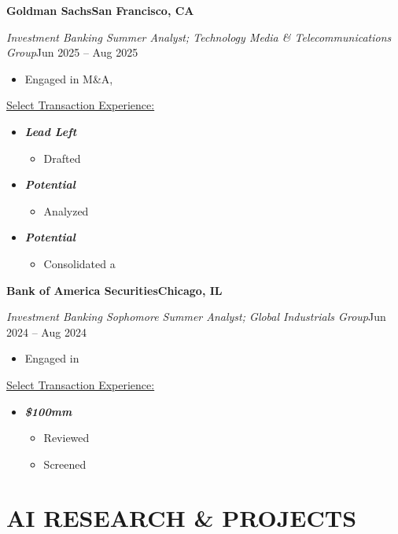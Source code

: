 \documentclass[10pt,letterpaper]{article}
\newcommand{\ressection}[1]{\section*{#1}}
\newcommand{\resheading}[4]{%
    \textbf{#1}\hfill \textbf{#2}\par
    \textit{#3}\hfill #4\par
}
\newcommand{\translabel}[1]{%
    {\setlength{\ULdepth}{2.2pt}\uline{#1}}%
}
\begin{document}
\resheading{Goldman Sachs}{San Francisco, CA}{Investment Banking Summer Analyst; Technology Media \& Telecommunications Group}{Jun 2025 -- Aug 2025}
\begin{itemize}
    \item Engaged in M\&A, 
\end{itemize}
\translabel{Select Transaction Experience:}\par
\begin{itemize}
    \item \textbf{\textit{Lead Left }}
    \begin{itemize}
        \item Drafted
    \end{itemize}
    \item \textbf{\textit{Potential}}
    \begin{itemize}
        \item Analyzed 
    \end{itemize}
    \item \textbf{\textit{Potential }}
    \begin{itemize}
        \item Consolidated a 
    \end{itemize}
\end{itemize}
\vspace{1pt}
\resheading{Bank of America Securities}{Chicago, IL}{Investment Banking Sophomore Summer Analyst; Global Industrials Group}{Jun 2024 -- Aug 2024}
\begin{itemize}
    \item Engaged in 
\end{itemize}
\translabel{Select Transaction Experience:}\par
\begin{itemize}
    \item \textbf{\textit{\$100mm }}
    \begin{itemize}
        \item Reviewed 
        \item Screened 
    \end{itemize}
\end{itemize}


\ressection{AI RESEARCH \& PROJECTS}
\end{document}
